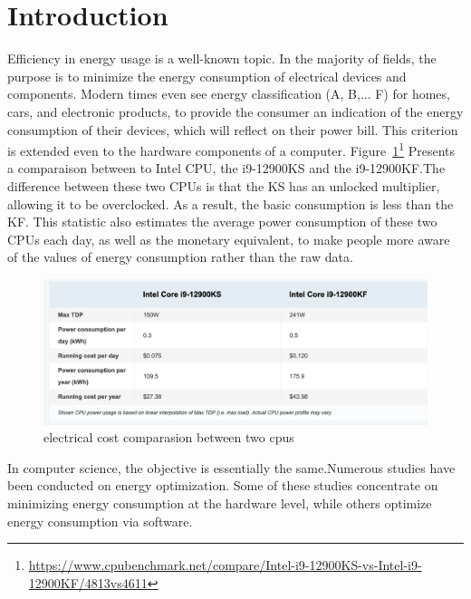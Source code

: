 

\section{Introduction}
Efficiency in energy usage is a well-known topic. In the majority of fields, the purpose is to minimize the energy consumption of electrical devices and components. Modern times even see energy classification (A, B,... F) for homes, cars, and electronic products, to provide the consumer an indication of the energy consumption of their devices, which will reflect on their power bill. This criterion is extended even to the hardware components of a computer.
Figure~\ref{fig:soa_comparaisoncpu}\footnote{\url{https://www.cpubenchmark.net/compare/Intel-i9-12900KS-vs-Intel-i9-12900KF/4813vs4611}} Presents a comparaison between to Intel CPU, the i9-12900KS and the i9-12900KF.The difference between these two CPUs is that the KS has an unlocked multiplier, allowing it to be overclocked. As a result, the basic consumption is less than the KF. This statistic also estimates the average power consumption of these two CPUs each day, as well as the monetary equivalent, to make people more aware of the values of energy consumption rather than the raw data.


\begin{figure}
    \includegraphics[width=\linewidth]{imgs/cpu_cost_comparaison}
    \caption{electrical cost comparasion between two cpus }
    \label{fig:soa_comparaisoncpu}
\end{figure}






In computer science, the objective is essentially the same.Numerous studies have been conducted on energy optimization. Some of these studies concentrate on minimizing energy consumption at the hardware level, while others optimize energy consumption via software.

